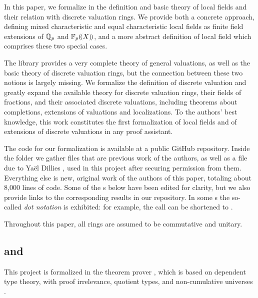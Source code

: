 \documentclass[sigplan,screen]{acmart}
\begin{document}
In this paper, we formalize in \lean the definition and basic theory of local fields and their relation with discrete valuation rings. We provide both a concrete approach, defining mixed characteristic and equal characteristic local fields as finite field extensions of $\mathbb{Q}_p$ and ${\mathbb{F}_{p}}(\!(X)\!)$, and a more abstract definition of local field which comprises these two special cases. 

The \mathlib library provides 
a very complete theory of general valuations, as well as the basic theory of discrete valuation rings, but the connection between these two notions is largely missing. We formalize the definition of discrete valuation and greatly expand the available theory for discrete valuation rings, their fields of fractions, and their associated discrete valuations, including theorems about completions, extensions of valuations and localizations.
To the authors' best knowledge, this work constitutes the first formalization of local fields and of extensions of discrete valuations in any proof assistant.

The \lean[\empty] code for our formalization is available at a public GitHub repository\href{https://github.com/mariainesdff/local_fields_journal}{\extlink}. Inside the folder \href{https://github.com/mariainesdff/local_fields_journal/tree/master/src/from_mathlib}{\extlink} we gather files that are previous work of the authors, as well as a file due to Yaël Dillies \href{https://github.com/mariainesdff/local_fields_journal/blob/master/src/from_mathlib/PR18604_well_founded.lean}{\extlink}, used in this project after securing permission from them. Everything else is new, original work of the authors of this paper, totaling about 8,000 lines of code. Some of the \LClistingname s below have been edited for clarity, but we also provide links to the corresponding results in our repository. In some \LClistingname s the so-called \emph{dot notation} is exhibited: for example, the call  can be shortened to .

Throughout this paper, all rings are assumed to be commutative and unitary.

\subsection{\texorpdfstring{\lean[\empty] and \mathlib}{Lean and mathlib}}
This project is formalized in the \lean theorem prover \cite{Lean3}, which is based on dependent type theory, with proof irrelevance, quotient types, and non-cumulative universes \cite{TypeTheory}.
\end{document}
